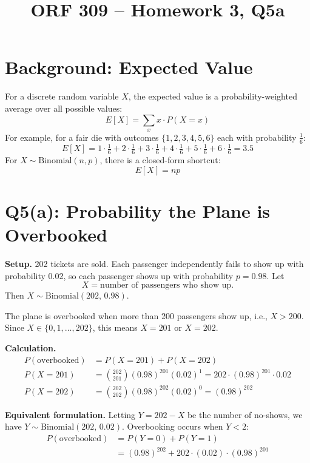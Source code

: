 \documentclass[12pt]{article}
\title{ORF 309 -- Homework 3, Q5a}
\author{}
\date{}
\begin{document}
\maketitle

\section*{Background: Expected Value}

For a discrete random variable $X$, the expected value is a probability-weighted average over all possible values:
\[
    E[X] = \sum_x x \cdot P(X = x)
\]
For example, for a fair die with outcomes $\{1,2,3,4,5,6\}$ each with probability $\frac{1}{6}$:
\[
    E[X] = 1\cdot\tfrac{1}{6} + 2\cdot\tfrac{1}{6} + 3\cdot\tfrac{1}{6} + 4\cdot\tfrac{1}{6} + 5\cdot\tfrac{1}{6} + 6\cdot\tfrac{1}{6} = 3.5
\]
For $X \sim \text{Binomial}(n, p)$, there is a closed-form shortcut:
\[
    E[X] = np
\]

\section*{Q5(a): Probability the Plane is Overbooked}

\textbf{Setup.} 202 tickets are sold. Each passenger independently fails to show up with probability 0.02, so each passenger shows up with probability $p = 0.98$. Let
\[
    X = \text{number of passengers who show up.}
\]
Then $X \sim \text{Binomial}(202,\, 0.98)$.

The plane is overbooked when more than 200 passengers show up, i.e., $X > 200$. Since $X \in \{0, 1, \ldots, 202\}$, this means $X = 201$ or $X = 202$.

\textbf{Calculation.}
\begin{align*}
    P(\text{overbooked}) &= P(X = 201) + P(X = 202) \\[6pt]
    P(X = 201) &= \binom{202}{201}(0.98)^{201}(0.02)^{1} = 202 \cdot (0.98)^{201} \cdot 0.02 \\[6pt]
    P(X = 202) &= \binom{202}{202}(0.98)^{202}(0.02)^{0} = (0.98)^{202}
\end{align*}

\textbf{Equivalent formulation.} Letting $Y = 202 - X$ be the number of no-shows, we have $Y \sim \text{Binomial}(202,\, 0.02)$. Overbooking occurs when $Y < 2$:
\begin{align*}
    P(\text{overbooked}) &= P(Y = 0) + P(Y = 1) \\
    &= (0.98)^{202} + 202 \cdot (0.02) \cdot (0.98)^{201}
\end{align*}
\end{document}
